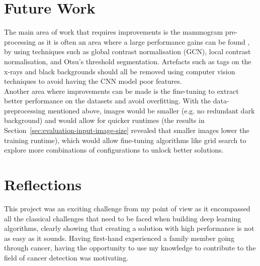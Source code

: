 
\section{Future Work}

The main area of work that requires improvements is the mammogram pre-processing as it is often an area where a large performance gains can be found \citep{Litjens2017}, by using techniques such as global contrast normalisation (GCN), local contrast normalisation, and Otsu’s threshold segmentation. Artefacts such as tags on the x-rays and black backgrounds should all be removed using computer vision techniques to avoid having the CNN model poor features.\\

Another area where improvements can be made is the fine-tuning to extract better performance on the datasets and avoid overfitting. With the data-preprocessing mentioned above, images would be smaller (e.g. no redundant dark background) and would allow for quicker runtimes (the results in Section~\ref{sec:evaluation-input-image-size} revealed that smaller images lower the training runtime), which would allow fine-tuning algorithms like grid search to explore more combinations of configurations to unlock better solutions.
    

\section{Reflections}

This project was an exciting challenge from my point of view as it encompassed all the classical challenges that need to be faced when building deep learning algorithms, clearly showing that creating a solution with high performance is not as easy as it sounds. Having first-hand experienced a family member going through cancer, having the opportunity to use my knowledge to contribute to the field of cancer detection was motivating.